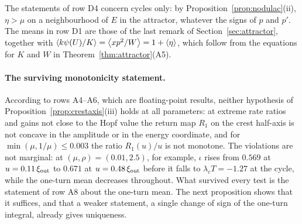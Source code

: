The statements of row D4 concern cycles only: by Proposition~\ref{prop:nodulac}(ii), $\eta>\mu$ on a neighbourhood of $E$ in the attractor, whatever the signs of $p$ and $p'$. The means in row D1 are those of the last remark of Section~\ref{sec:attractor}, together with $\left\langle k\psi(U)/K\right\rangle=\left\langle xp^2/W\right\rangle=1+\left\langle \eta\right\rangle$, which follow from the equations for $K$ and $W$ in Theorem~\ref{thm:attractor}(A5).

\paragraph{The surviving monotonicity statement.}
According to rows A4--A6, which are floating-point results, neither hypothesis of Proposition~\ref{prop:crestaxis}(iii) holds at all parameters: at extreme rate ratios and gains not close to the Hopf value the return map $R_1$ on the crest half-axis is not concave in the amplitude or in the energy coordinate, and for $\min(\mu,1/\mu)\le0.003$ the ratio $R_1(u)/u$ is not monotone. The violations are not marginal: at $(\mu,\rho)=(0.01,2.5)$, for example, $\iota$ rises from $0.569$ at $u=0.11\,\xi_{\rm out}$ to $0.671$ at $u=0.48\,\xi_{\rm out}$ before it falls to $\lambda_cT=-1.27$ at the cycle, while the one-turn mean decreases throughout. What survived every test is the statement of row A8 about the one-turn mean. The next proposition shows that it suffices, and that a weaker statement, a single change of sign of the one-turn integral, already gives uniqueness.

